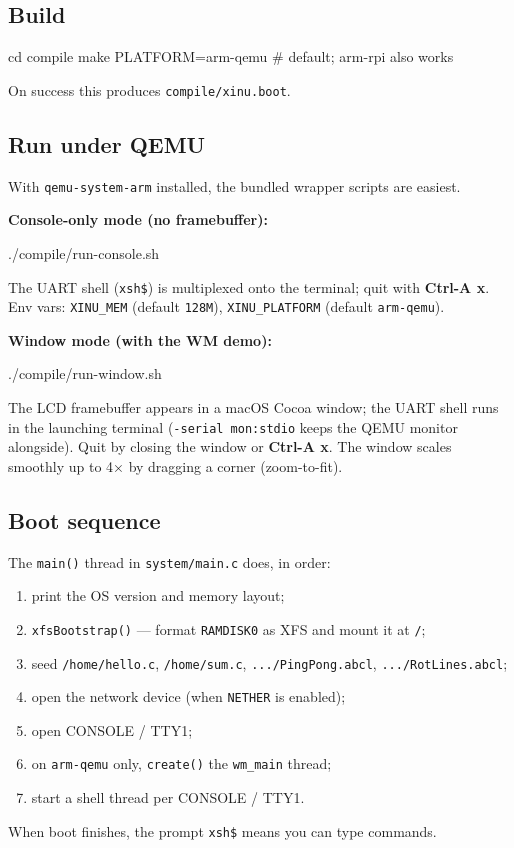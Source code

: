 \documentclass[a4paper,11pt]{article}
\begin{document}
\subsection{Build}
\begin{code}
cd compile
make PLATFORM=arm-qemu        # default; arm-rpi also works
\end{code}
On success this produces \verb|compile/xinu.boot|.

\subsection{Run under QEMU}
With \verb|qemu-system-arm| installed, the bundled wrapper scripts are easiest.

\textbf{Console-only mode (no framebuffer):}
\begin{code}
./compile/run-console.sh
\end{code}
The UART shell (\verb|xsh$|) is multiplexed onto the terminal; quit with
\textbf{Ctrl-A \textrightarrow{} x}. Env vars: \verb|XINU_MEM| (default
\verb|128M|), \verb|XINU_PLATFORM| (default \verb|arm-qemu|).

\textbf{Window mode (with the WM demo):}
\begin{code}
./compile/run-window.sh
\end{code}
The LCD framebuffer appears in a macOS Cocoa window; the UART shell runs in the
launching terminal (\verb|-serial mon:stdio| keeps the QEMU monitor alongside).
Quit by closing the window or \textbf{Ctrl-A \textrightarrow{} x}. The window
scales smoothly up to 4× by dragging a corner (zoom-to-fit).

\subsection{Boot sequence}
The \verb|main()| thread in \verb|system/main.c| does, in order:
\begin{enumerate}[leftmargin=1.6em,itemsep=1pt]
\item print the OS version and memory layout;
\item \verb|xfsBootstrap()| --- format \verb|RAMDISK0| as XFS and mount it at \verb|/|;
\item seed \verb|/home/hello.c|, \verb|/home/sum.c|,
  \verb|.../PingPong.abcl|, \verb|.../RotLines.abcl|;
\item open the network device (when \verb|NETHER| is enabled);
\item open CONSOLE / TTY1;
\item on \verb|arm-qemu| only, \verb|create()| the \verb|wm_main| thread;
\item start a shell thread per CONSOLE / TTY1.
\end{enumerate}
When boot finishes, the prompt \verb|xsh$| means you can type commands.
\end{document}
